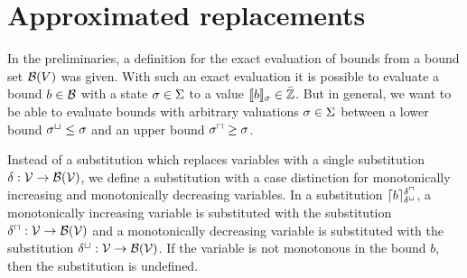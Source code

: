 \section{Approximated replacements}

In the preliminaries, a definition for the exact evaluation of bounds from a bound set $\mathcal{B}(V)$ was given.
With such an exact evaluation it is possible to evaluate a bound $b \in \mathcal{B}$ with a state $\sigma \in \Sigma$ to a value $\llbracket b \rrbracket_{\sigma} \in \bar{\mathbb{Z}}$.
But in general, we want to be able to evaluate bounds with arbitrary valuations $\sigma \in \Sigma$ between a lower bound ${\sigma^\sqcup} \leq \sigma$ and an upper bound ${\sigma^\sqcap} \geq \sigma$.


Instead of a substitution which replaces variables with a single substitution $\delta: \mathcal{V} \rightarrow \mathcal{B}(\mathcal{V})$, we define a substitution with a case distinction for monotonically increasing and monotonically decreasing variables.
In a substitution $\lceil b \rceil^{\delta^\sqcap}_{\delta^\sqcup}$, a monotonically increasing variable is substituted with the substitution $\delta^\sqcap: \mathcal{V} \rightarrow \mathcal{B}(\mathcal{V})$ and a monotonically decreasing variable is substituted with the substitution $\delta^\sqcup: \mathcal{V} \rightarrow \mathcal{B}(\mathcal{V})$.
If the variable is not monotonous in the bound $b$, then the substitution is undefined.
